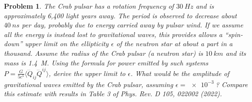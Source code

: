 \documentclass{article}
\newtheorem{prob}{Problem}
\begin{document}
\begin{prob}
  The Crab pulsar has a rotation frequency of $\SI{30}{Hz}$ and is approximately 6,400 light years away.
  The period is observed to decrease about $\SI{40}{ns}$ per day, probably due to energy carried away by pulsar wind.
  If we assume all the energy is instead lost to gravitational waves,
  this provides allows a ``spin-down'' upper limit on the ellipticity $\epsilon$ of the neutron star at about a part in a thousand.
  Assume the radius of the Crab pulsar (a neutron star) is $\SI{10}{km}$ and its mass is \SI{1.4}{M_{\odot}}.
  Using the formula for power emitted by such systems $P = \frac{G}{5c^{5}}\langle \dddot{Q}_{ij}\dddot{Q}^{ij} \rangle$,
  derive the upper limit to $\epsilon$.
  What would be the amplitude of gravitational waves emitted by the Crab pulsar, assuming $\epsilon = \SI{e-3}{}$?
  Compare this estimate with results in Table 3 of Phys. Rev. D 105, 022002 (2022).
\end{prob}
\end{document}
